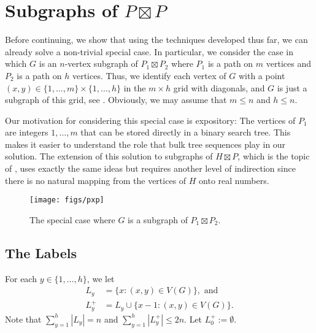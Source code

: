 \documentclass[kpfonts]{patmorin}
\let\le\leqslant
\let\leq\leqslant
\begin{document}
\section{Subgraphs of $P\boxtimes P$}

Before continuing, we show that using the techniques developed thus far, we can already solve a non-trivial special case.  In particular, we consider the case in which $G$ is an $n$-vertex subgraph of $P_1\boxtimes P_2$ where $P_1$ is a path on $m$ vertices and $P_2$ is a path on $h$ vertices.  Thus, we identify each vertex of $G$ with a point $(x,y)\in\{1,\dots,m\}\times \{1,\dots,h\}$ in the $m\times h$ grid with diagonals, and $G$ is just a subgraph of this grid, see .
Obviously, we may assume that $m\leq n$ and $h\leq n$.

Our motivation for considering this special case is expository: The vertices of $P_1$ are integers $1,\dots,m$ that can be stored directly in a binary search tree. This makes it easier to understand the role that bulk tree sequences play in our solution.  The extension of this solution to subgraphs of $H\boxtimes P$, which is the topic of , uses exactly the same ideas but requires another level of indirection since there is no natural mapping from the vertices of $H$ onto real numbers.

\begin{figure}
  \begin{center}
    \texttt{[image: figs/pxp]}
  \end{center}
  \caption{The special case where $G$ is a subgraph of $P_1\boxtimes P_2$.}
\end{figure}


\subsection{The Labels}

For each $y\in\{1,\dots,h\}$, we let
\begin{align*}
L_y&=\{x:(x,y)\in V(G)\}, \textrm{ and}\\
L^+_y&=L_y\cup\{x-1:(x,y)\in V(G)\}.
\end{align*}
Note that $\sum_{y=1}^h |L_y| = n$ and $\sum_{y=1}^h |L^+_y|\le 2n$.
Let $L^+_0 := \emptyset$.
\end{document}
